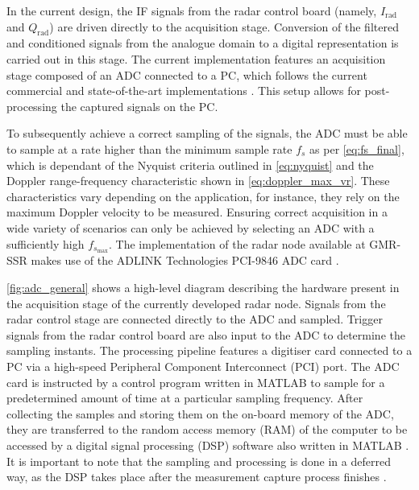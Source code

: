 In the current design, the IF signals from the radar control board (namely, $I_\mathrm{rad}$ and $Q_\mathrm{rad}$) are driven directly to the acquisition stage. Conversion of the filtered and conditioned signals from the analogue domain to a digital representation is carried out in this stage. The current implementation features an acquisition stage composed of an ADC connected to a PC, which follows the current commercial and state-of-the-art implementations \cite{Antolinos2020,Biase2020,Zanardi2021,Seifert2019, Iyer2022, Amin2017}. This setup allows for post-processing the captured signals on the PC.

To subsequently achieve a correct sampling of the signals, the ADC must be able to sample at a rate higher than the minimum sample rate $f_s$ as per \cref{eq:fs_final}, which is dependant of the Nyquist criteria outlined in \cref{eq:nyquist} and the Doppler range-frequency characteristic shown in \cref{eq:doppler_max_vr}. These characteristics vary depending on the application, for instance, they rely on the maximum Doppler velocity to be measured. Ensuring correct acquisition in a wide variety of scenarios can only be achieved by selecting an ADC with a sufficiently high $f_{s_{\max}}$. The implementation of the radar node available at GMR-SSR makes use of the ADLINK Technologies PCI-9846 ADC card \cite{ADLINKTechnologies2010, Sardinero2022}.

\cref{fig:adc_general} shows a high-level diagram describing the hardware present in the acquisition stage of the currently developed radar node. Signals from the radar control stage are connected directly to the ADC and sampled. Trigger signals from the radar control board are also input to the ADC to determine the sampling instants. The processing pipeline features a digitiser card connected to a PC via a high-speed Peripheral Component Interconnect (PCI) port. The ADC card is instructed by a control program written in MATLAB \cite{Antolinos2020, Sardinero2022} to sample for a predetermined amount of time at a particular sampling frequency. After collecting the samples and storing them on the on-board memory of the ADC, they are transferred to the random access memory (RAM) of the computer to be accessed by a digital signal processing (DSP) software also written in MATLAB \cite{Antolinos2020, Sardinero2022}. It is important to note that the sampling and processing is done in a deferred way, as the DSP takes place after the measurement capture process finishes \cite[p.~43-44]{ADLINKTechnologies2010}.


